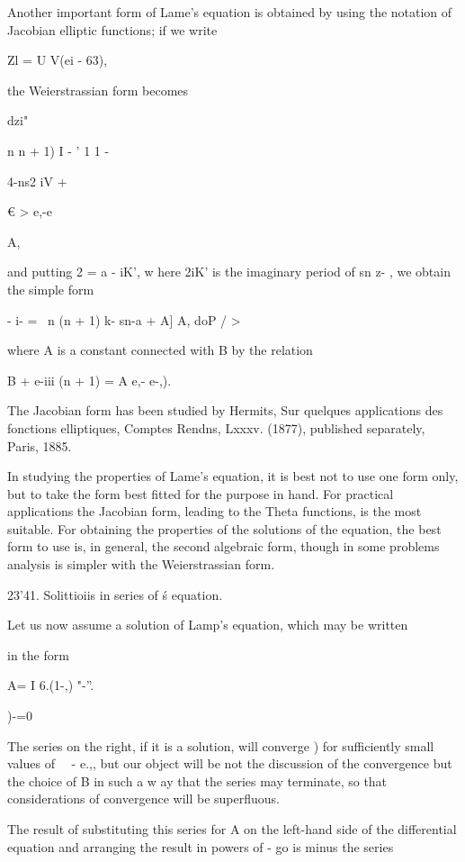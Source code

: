 {{{{Another important form of Lame's equation is obtained by using the
notation of Jacobian elliptic functions; if we write

Zl = U V(ei - 63),

the Weierstrassian form becomes

dzi"

n n + 1) I - ' 1 1 -

4-ns2 iV +

€ > e,-e

A,

and putting 2 = a - iK', w here 2iK' is the imaginary period of sn z-
, we obtain the simple form

- i- = \ n (n + 1) k- sn-a + A] A, doP / >

where A is a constant connected with B by the relation

B + e-iii (n + 1) = A e,- e-,).

The Jacobian form has been studied by Hermits, Sur quelques
applications des fonctions elliptiques, Comptes Rendns, Lxxxv. (1877),
published separately, Paris, 1885.

In studying the properties of Lame's equation, it is best not to use
one form only, but to take the form best fitted for the purpose in
hand. For practical applications the Jacobian form, leading to the
Theta functions, is the most suitable. For obtaining the properties of
the solutions of the equation, the best form to use is, in general,
the second algebraic form, though in some problems analysis is simpler
with the Weierstrassian form.

%
%

23'41. Solittioiis in series of \Lame\'s equation.

Let us now assume a solution of Lamp's equation, which may be written

in the form

A= I 6.(1-,) "-''.

)-=0

The series on the right, if it is a solution, will converge )
for sufficiently small values of \ \ - e.,, but our object will be
not the discussion of the convergence but the choice of B in such a w
ay that the series may terminate, so that considerations of
convergence will be superfluous.

The result of substituting this series for A on the left-hand side of
the differential equation and arranging the result in powers of - go
is minus the series

}}}}
